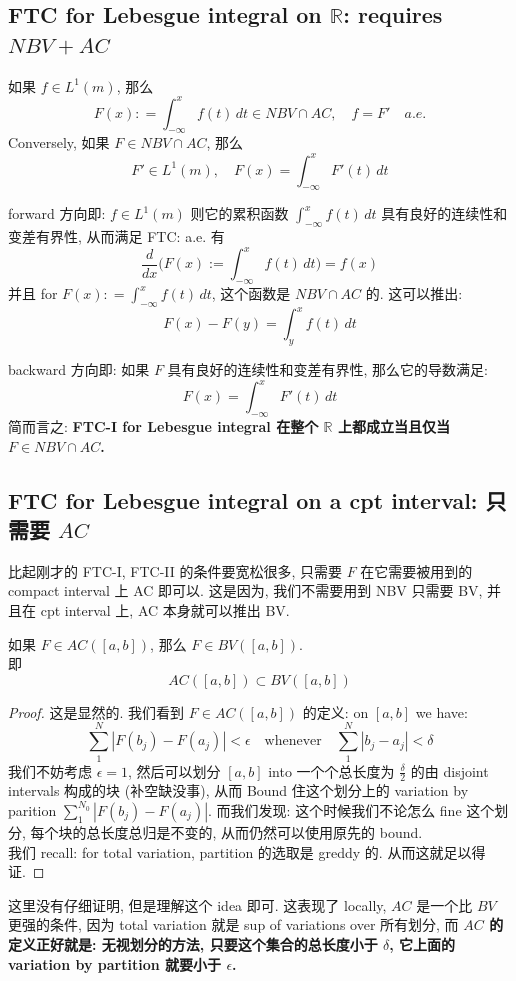 \documentclass[lang=cn,11pt]{elegantbook}
\begin{document}
\subsection{FTC for Lebesgue integral on $\mathbb{R}$: requires $NBV + AC$}
\begin{corollary}{}
    如果 $f \in L^1(m)$, 那么 \[
    F(x) : = \int_{-\infty}^x f(t) \,d t \in NBV \cap AC,\quad     f = F' \quad a.e.
    \]
Conversely, 如果 $F \in NBV \cap AC$, 那么 \[
    F' \in L^1(m), \quad F(x) = \int_{-\infty}^x F'(t) \, dt
    \]
\end{corollary}
\begin{remark}
forward 方向即: $f\in L^1(m)$ 则它的累积函数 $\int_{-\infty}^x f(t) \,d t $ 具有良好的连续性和变差有界性, 从而满足 FTC: a.e. 有 \[
\frac{d}{dx} \bigg( F(x):=\int_{-\infty}^x f(t) \,d t  \bigg) = f(x)
\]
并且 for $  F(x) : = \int_{-\infty}^x f(t) \,d t $, 这个函数是 $NBV \cap AC$ 的. 这可以推出: \[
F(x) - F(y) = \int_y^x f(t) \, dt
\]

backward 方向即: 如果 $F$ 具有良好的连续性和变差有界性, 那么它的导数满足: \[F(x) = \int_{-\infty}^x F'(t) \, dt    \]
简而言之: \textbf{FTC-I for Lebesgue integral 在整个 $\mathbb{R}$ 上都成立当且仅当 $F \in NBV \cap AC$.}
\end{remark}


\subsection{FTC for Lebesgue integral on a cpt interval: 只需要 $AC$}
比起刚才的 FTC-I, FTC-II 的条件要宽松很多, 只需要 $F$ 在它需要被用到的 compact interval 上 AC 即可以. 这是因为, 我们不需要用到 NBV 只需要 BV, 并且在 cpt interval 上, AC 本身就可以推出 BV.
\begin{lemma}
    如果 $F\in AC([a,b])$, 那么 $F\in BV([a,b])$.\\
    即 \[
    AC([a,b]) \subset BV([a,b])
    \]
\end{lemma}
\begin{proof}
    这是显然的. 我们看到 $F \in AC([a,b])$ 的定义: on $[a,b]$ we have: \[
\sum_1^N |F(b_j) - F(a_j)| <\epsilon \quad  \text{whenever}\quad \sum_1^N |b_j - a_j| <\delta
\]
我们不妨考虑 $\epsilon = 1$, 然后可以划分 $[a,b]$ into 一个个总长度为 $\frac{\delta}{2}$ 的由 disjoint intervals 构成的块 (补空缺没事), 从而 Bound 住这个划分上的 variation by parition \(\sum_1^{N_0} |F(b_j) - F(a_j)| \). 而我们发现: 这个时候我们不论怎么 fine 这个划分, 每个块的总长度总归是不变的, 从而仍然可以使用原先的 bound.\\
我们 recall: for total variation, partition 的选取是 greddy 的. 从而这就足以得证.
\end{proof}
\begin{remark}
这里没有仔细证明, 但是理解这个 idea 即可. 这表现了 locally, $AC$ 是一个比 $BV$ 更强的条件, 因为 total variation 就是 sup of variations over 所有划分, 而 \textbf{$AC$ 的定义正好就是: 无视划分的方法, 只要这个集合的总长度小于 $\delta$, 它上面的 variation by partition 就要小于 $\epsilon$. }
\end{remark}
\end{document}
